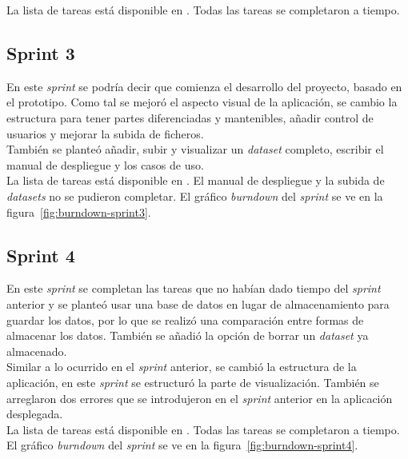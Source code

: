 La lista de tareas está disponible en
. Todas las tareas se completaron a tiempo.\\

\subsection{Sprint 3}
En este \textit{sprint} se podría decir que comienza el desarrollo del proyecto,
basado en el prototipo. Como tal se mejoró el aspecto visual de la aplicación,
se cambio la estructura para tener partes diferenciadas y mantenibles, añadir
control de usuarios y mejorar la subida de ficheros.\\

También se planteó añadir, subir y visualizar un \textit{dataset} completo,
escribir el manual de despliegue y los casos de uso.\\

La lista de tareas está disponible en
. El manual de despliegue y la subida de \textit{datasets} no se pudieron
completar. El gráfico \textit{burndown} del \textit{sprint} se ve en la
figura~\ref{fig:burndown-sprint3}.\\


\subsection{Sprint 4}
En este \textit{sprint} se completan las tareas que no habían dado tiempo del
\textit{sprint} anterior y se planteó usar una base de datos en lugar de
almacenamiento para guardar los datos, por lo que se realizó una comparación
entre formas de almacenar los datos. También se añadió la opción de borrar un
\textit{dataset} ya almacenado.\\

Similar a lo ocurrido en el \textit{sprint} anterior, se cambió la estructura 
de la aplicación, en este \textit{sprint} se estructuró la parte de 
visualización. También se arreglaron dos errores que se introdujeron en el
\textit{sprint} anterior en la aplicación desplegada.\\

La lista de tareas está disponible en
. Todas las tareas se completaron a tiempo. El gráfico \textit{burndown} del 
\textit{sprint} se ve en la figura~\ref{fig:burndown-sprint4}.\\

